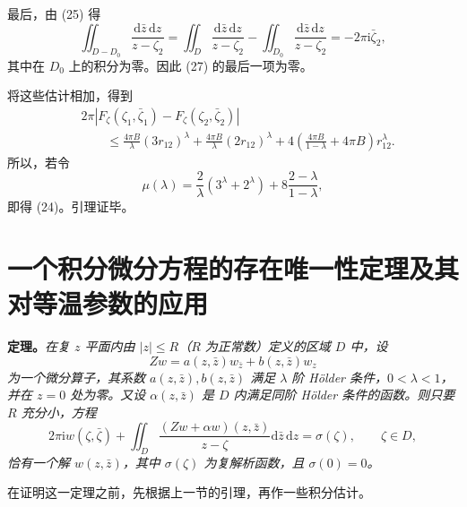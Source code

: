 \documentclass[UTF8,a4paper,11pt,fontset=fandol]{ctexart}
\newcommand{\dd}{\mathrm d}
\newcommand{\ii}{\mathrm i}
\newcommand{\dz}{\dd\bar z\,\dd z}
\newcommand{\zz}{\bar\zeta}
\begin{document}
最后，由 (25) 得
\[\iint_{D-D_0}\frac{\dz}{z-\zeta_2}=\iint_D\frac{\dz}{z-\zeta_2}-\iint_{D_0}\frac{\dz}{z-\zeta_2}=-2\pi\ii\bar\zeta_2,\]
其中在 $D_0$ 上的积分为零。因此 (27) 的最后一项为零。

将这些估计相加，得到
\begin{align*}
&2\pi|F_\zeta(\zeta_1,\bar\zeta_1)-F_\zeta(\zeta_2,\bar\zeta_2)|\\
&\qquad\le\frac{4\pi B}\lambda(3r_{12})^\lambda+\frac{4\pi B}\lambda(2r_{12})^\lambda
+4\left(\frac{4\pi B}{1-\lambda}+4\pi B\right)r_{12}^{\lambda}.
\end{align*}
所以，若令
\begin{equation}\mu(\lambda)=\frac2\lambda(3^\lambda+2^\lambda)+8\frac{2-\lambda}{1-\lambda},\tag{28}\end{equation}
即得 (24)。引理证毕。

\section{一个积分微分方程的存在唯一性定理及其对等温参数的应用}
\textbf{定理。}\textit{在复 $z$ 平面内由 $|z|\le R$（$R$ 为正常数）定义的区域 $D$ 中，设
\begin{equation}Zw=a(z,\bar z)w_{\bar z}+b(z,\bar z)w_z\tag{29}\end{equation}
为一个微分算子，其系数 $a(z,\bar z),b(z,\bar z)$ 满足 $\lambda$ 阶 Hölder 条件，$0<\lambda<1$，并在 $z=0$ 处为零。又设 $\alpha(z,\bar z)$ 是 $D$ 内满足同阶 Hölder 条件的函数。则只要 $R$ 充分小，方程
\begin{equation}2\pi\ii w(\zeta,\zz)+\iint_D\frac{(Zw+\alpha w)(z,\bar z)}{z-\zeta}\dz=\sigma(\zeta),\qquad\zeta\in D,\tag{30}\end{equation}
恰有一个解 $w(z,\bar z)$，其中 $\sigma(\zeta)$ 为复解析函数，且 $\sigma(0)=0$。}

在证明这一定理之前，先根据上一节的引理，再作一些积分估计。
\end{document}
